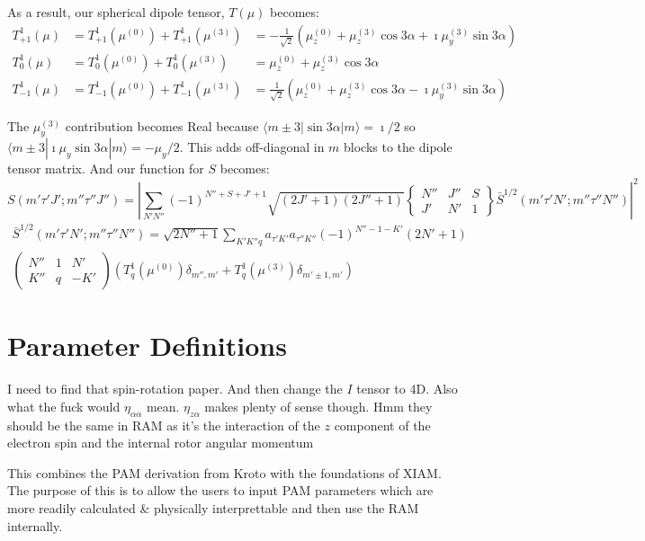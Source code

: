 \documentclass{article}
\begin{document}
As a result, our spherical dipole tensor, $T(\mu)$ becomes:
\begin{eqnarray}
	T^{1}_{+1}(\mu) &= T^{1}_{+1}(\mu^{(0)}) + T^{1}_{+1}(\mu^{(3)}) &= -\frac{1}{\sqrt{2}}\left(\mu^{(0)}_{z} + \mu^{(3)}_{z}\cos3\alpha + \imath\mu^{(3)}_{y}\sin3\alpha\right) \\
	T^{1}_{0}(\mu) &= T^{1}_{0}(\mu^{(0)}) + T^{1}_{0}(\mu^{(3)}) &= \mu^{(0)}_{z} + \mu^{(3)}_{z}\cos3\alpha \\
	T^{1}_{-1}(\mu) &= T^{1}_{-1}(\mu^{(0)}) + T^{1}_{-1}(\mu^{(3)}) &= \frac{1}{\sqrt{2}}\left(\mu^{(0)}_{z} + \mu^{(3)}_{z}\cos3\alpha - \imath\mu^{(3)}_{y}\sin3\alpha\right) 
\end{eqnarray}

The $\mu_{y}^{(3)}$ contribution becomes Real because $\langle m\pm3|\sin3\alpha|m\rangle=\imath/2$ so $\langle m\pm3|\imath\mu_{y}\sin3\alpha|m\rangle=-\mu_{y}/2$.
This adds off-diagonal in $m$ blocks to the dipole tensor matrix.
And our function for $S$ becomes:
\begin{equation}
S(m'\tau'J';m''\tau''J'') = \left|\sum_{N'N''}(-1)^{N''+S+J'+1} \sqrt{(2J'+1)(2J''+1)} 
\begin{Bmatrix}
	N'' & J'' & S \\
	J' & N' & 1
\end{Bmatrix}
\bar{S}^{1/2}(m'\tau'N';m''\tau''N'')
\right|^{2}
\end{equation}
\begin{multline}
\bar{S}^{1/2}(m'\tau'N';m''\tau''N'') = \sqrt{2N''+1}\sum_{K'K''q} a_{\tau'K'}a_{\tau''K''} (-1)^{N''-1-K'}(2N'+1) \\
\begin{pmatrix}
	N'' & 1 & N' \\
	K'' & q & -K'
\end{pmatrix}
\left(T^{1}_{q}(\mu^{(0)})\delta_{m'',m'} + T^{1}_{q}(\mu^{(3)})\delta_{m'\pm1,m'} \right)
\end{multline}

\section{Parameter Definitions}
I need to find that spin-rotation paper. And then change the $I$ tensor to 4D. Also what the fuck would $\eta_{\alpha\alpha}$ mean. $\eta_{z\alpha}$ makes plenty of sense though. Hmm they should be the same in RAM as it's the interaction of the $z$ component of the electron spin and the internal rotor angular momentum

This combines the PAM derivation from Kroto with the foundations of XIAM. The purpose of this is to allow the users to input PAM parameters which are more readily calculated \& physically interprettable and then use the RAM internally.
\end{document}
